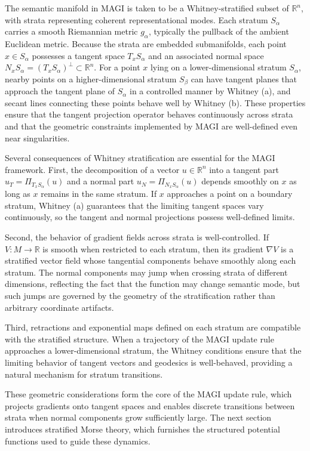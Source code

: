 \documentclass[12pt]{article}
\begin{document}
The semantic manifold in MAGI is taken to be a Whitney-stratified subset of $\mathbb{R}^n$, with strata representing coherent representational modes. Each stratum $S_\alpha$ carries a smooth Riemannian metric $g_\alpha$, typically the pullback of the ambient Euclidean metric. Because the strata are embedded submanifolds, each point $x \in S_\alpha$ possesses a tangent space $T_x S_\alpha$ and an associated normal space $N_x S_\alpha = (T_x S_\alpha)^\perp \subset \mathbb{R}^n$. For a point $x$ lying on a lower-dimensional stratum $S_\alpha$, nearby points on a higher-dimensional stratum $S_\beta$ can have tangent planes that approach the tangent plane of $S_\alpha$ in a controlled manner by Whitney (a), and secant lines connecting these points behave well by Whitney (b). These properties ensure that the tangent projection operator behaves continuously across strata and that the geometric constraints implemented by MAGI are well-defined even near singularities.

Several consequences of Whitney stratification are essential for the MAGI framework. First, the decomposition of a vector $u \in \mathbb{R}^n$ into a tangent part $u_T = \Pi_{T_x S_\alpha}(u)$ and a normal part $u_N = \Pi_{N_x S_\alpha}(u)$ depends smoothly on $x$ as long as $x$ remains in the same stratum. If $x$ approaches a point on a boundary stratum, Whitney (a) guarantees that the limiting tangent spaces vary continuously, so the tangent and normal projections possess well-defined limits.

Second, the behavior of gradient fields across strata is well-controlled. If $V : M \to \mathbb{R}$ is smooth when restricted to each stratum, then its gradient $\nabla V$ is a stratified vector field whose tangential components behave smoothly along each stratum. The normal components may jump when crossing strata of different dimensions, reflecting the fact that the function may change semantic mode, but such jumps are governed by the geometry of the stratification rather than arbitrary coordinate artifacts.

Third, retractions and exponential maps defined on each stratum are compatible with the stratified structure. When a trajectory of the MAGI update rule approaches a lower-dimensional stratum, the Whitney conditions ensure that the limiting behavior of tangent vectors and geodesics is well-behaved, providing a natural mechanism for stratum transitions.

These geometric considerations form the core of the MAGI update rule, which projects gradients onto tangent spaces and enables discrete transitions between strata when normal components grow sufficiently large. The next section introduces stratified Morse theory, which furnishes the structured potential functions used to guide these dynamics.
\end{document}
